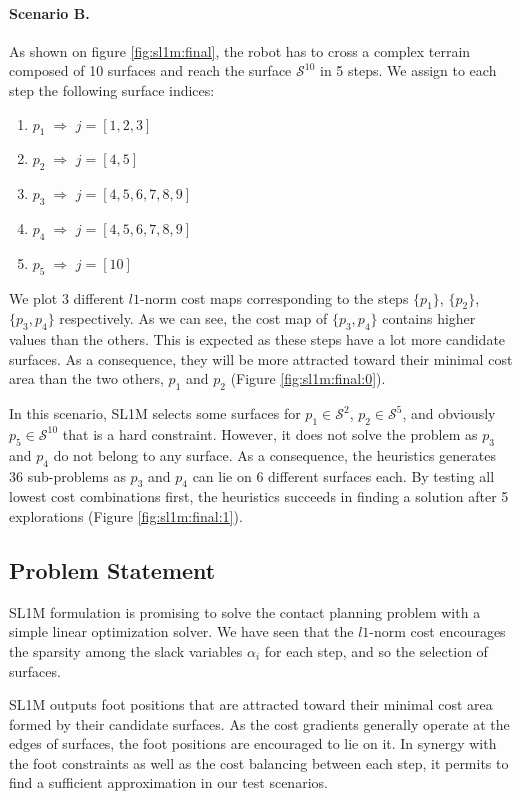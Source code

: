 \paragraph{Scenario B.}
As shown on figure \ref{fig:sl1m:final}, the robot has to cross a complex terrain composed of 10 surfaces and reach the surface $\mathcal{S}^10$ in 5 steps. We assign to each step the following surface indices:
\begin{enumerate}
    \item $p_1 \; \Rightarrow$ \; $j = [1,2,3]$
    \item $p_2 \; \Rightarrow$ \; $j = [4,5]$
    \item $p_3 \; \Rightarrow$ \; $j = [4,5,6,7,8,9]$
    \item $p_4 \; \Rightarrow$ \; $j = [4,5,6,7,8,9]$
    \item $p_5 \; \Rightarrow$ \; $j = [10]$
\end{enumerate}
We plot 3 different $l1$-norm cost maps corresponding to the steps $\{p_1\}$, $\{p_2\}$, $\{p_3,p_4\}$ respectively.
As we can see, the cost map of $\{p_3,p_4\}$ contains higher values than the others. This is expected as these steps have a lot more candidate surfaces. As a consequence, they will be more attracted toward their minimal cost area than the two others, $p_1$ and $p_2$ (Figure \ref{fig:sl1m:final:0}).

In this scenario, SL1M selects some surfaces for $p_1 \in \mathcal{S}^2$, $p_2 \in \mathcal{S}^5$, and obviously $p_5 \in \mathcal{S}^{10}$ that is a hard constraint. However, it does not solve the problem as $p_3$ and $p_4$ do not belong to any surface.
As a consequence, the heuristics generates 36 sub-problems as $p_3$ and $p_4$ can lie on 6 different surfaces each. By testing all lowest cost combinations first, the heuristics succeeds in finding a solution after 5 explorations (Figure \ref{fig:sl1m:final:1}).

\subsection{Problem Statement}
SL1M formulation is promising to solve the contact planning problem with a simple linear optimization solver.
We have seen that the $l1$-norm cost encourages the sparsity among the slack variables $\alpha_i$ for each step, and so the selection of surfaces.

SL1M outputs foot positions that are attracted toward their minimal cost area formed by their candidate surfaces.
As the cost gradients generally operate at the edges of surfaces, the foot positions are encouraged to lie on it.
In synergy with the foot constraints as well as the cost balancing between each step, it permits to find a sufficient approximation in our test scenarios.

